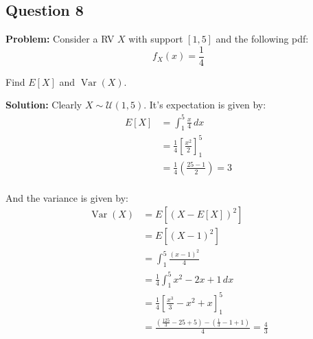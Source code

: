 \documentclass{article}
\DeclareMathOperator{\Var}{Var}
\newcommand*\eval[3]{\left[#1\right]_{#2}^{#3}}
\begin{document}
\subsection*{Question 8}
\noindent\textbf{Problem:} Consider a RV $X$ with support $[1,5]$ and the following pdf:
$$f_X(x)=\frac{1}{4}$$

Find $E[X]$ and $\Var(X)$.
\bigskip

\noindent\textbf{Solution:} Clearly $X\sim\mathcal{U}(1,5)$. It's expectation is given by:
\begin{align*}
  E[X]&=\int_1^5\frac{x}{4}\,dx\\
  &=\frac{1}{4}\eval{\frac{x^2}{2}}{1}{5}\\
  &=\frac{1}{4}\left(\frac{25-1}{2}\right)=\boxed{3}\\
\end{align*}

And the variance is given by:
\begin{align*}  
  \Var(X)&=E[(X-E[X])^2]\\
  &=E[(X-1)^2]\\
  &=\int_1^5 \frac{(x-1)^2}{4}\\
  &=\frac{1}{4}\int_1^5 x^2-2x+1\,dx\\
  &=\frac{1}{4}\eval{\frac{x^3}{3}-x^2+x}{1}{5}\\
  &=\frac{\left(\frac{125}{3}-25+5\right)-\left(\frac{1}{3}-1+1\right)}{4}=\boxed{\frac{4}{3}}
\end{align*}
\end{document}
